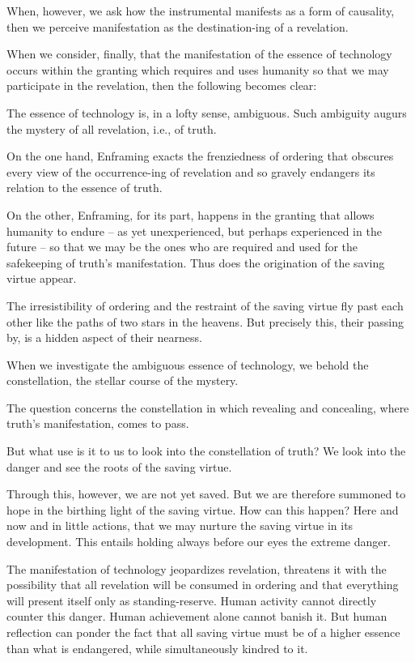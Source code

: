 \documentclass[paper=a4, fontsize=11pt,twoside]{scrartcl}
\begin{document}
When, however, we ask how the instrumental manifests as a form of causality, then we perceive manifestation as the destination-ing of a revelation.

When we consider, finally, that the manifestation of the essence of technology occurs within the granting which requires and uses humanity so that we may participate in the revelation, then the following becomes clear:

The essence of technology is, in a lofty sense, ambiguous. Such ambiguity augurs the mystery of all revelation, i.e., of truth.

On the one hand, Enframing exacts the frenziedness of ordering that obscures every view of the occurrence-ing of revelation and so gravely endangers its relation to the essence of truth.

On the other, Enframing, for its part, happens in the granting that allows humanity to endure -- as yet unexperienced, but perhaps experienced in the future -- so that we may be the ones who are required and used for the safekeeping of truth's manifestation. Thus does the origination of the saving virtue appear.

The irresistibility of ordering and the restraint of the saving virtue fly past each other like the paths of two stars in the heavens. But precisely this, their passing by, is a hidden aspect of their nearness.

When we investigate the ambiguous essence of technology, we behold the constellation, the stellar course of the mystery.

The question concerns the constellation in which revealing and concealing, where truth's manifestation, comes to pass.

But what use is it to us to look into the constellation of truth? We look into the danger and see the roots of the saving virtue.

Through this, however, we are not yet saved. But we are therefore summoned to hope in the birthing light of the saving virtue. How can this happen? Here and now and in little actions, that we may nurture the saving virtue in its development. This entails holding always before our eyes the extreme danger.

The manifestation of technology jeopardizes revelation, threatens it with the possibility that all revelation will be consumed in ordering and that everything will present itself only as standing-reserve. Human activity cannot directly counter this danger. Human achievement alone cannot banish it. But human reflection can ponder the fact that all saving virtue must be of a higher essence than what is endangered, while simultaneously kindred to it.
\end{document}
